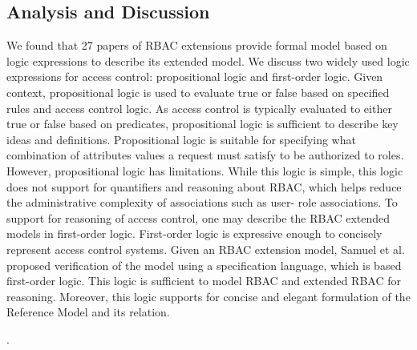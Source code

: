 \subsection{Analysis and Discussion}

We found that 27 papers of RBAC extensions provide formal model based on logic expressions to describe its extended model.
We discuss two widely used logic expressions for access control: propositional logic and first-order logic. 
Given context, propositional logic is used to evaluate true or false based on specified rules and access control logic. As access control is typically evaluated to either true or false based on predicates, propositional logic is sufficient to describe key ideas and definitions. Propositional logic is suitable for specifying what combination of attributes values a request must satisfy to be authorized to roles.
However, propositional logic has limitations. While this logic is simple, this logic does not support for quantifiers and reasoning about RBAC, which helps
reduce the administrative complexity of associations such as user- role associations.
To support for reasoning of access control, one may describe the RBAC extended models in first-order logic. First-order logic is expressive enough to concisely represent access control systems.
Given an RBAC extension model, Samuel et al.~\cite{samuel07:spatio-temporal} proposed verification of the model using a specification language, which is based first-order logic. 
This logic is sufficient to model RBAC and extended RBAC for reasoning. 
Moreover, this logic supports for concise and elegant formulation of the Reference Model and its relation. 
 
 





.
